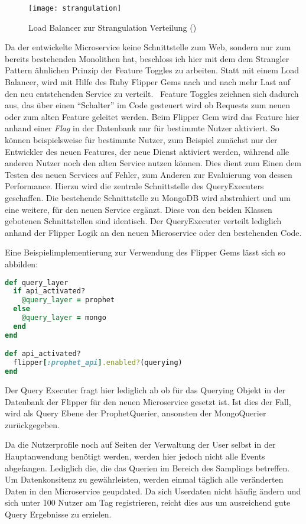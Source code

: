 \begin{figure}[h]
    \caption{Load Balancer zur Strangulation Verteilung (\cite{Hammant:Strangler})}
    \texttt{[image: strangulation]}
\end{figure}

Da der entwickelte Microservice keine Schnittstelle zum Web, sondern nur zum bereits bestehenden Monolithen hat, beschloss ich hier mit dem dem Strangler Pattern ähnlichen Prinzip der Feature Toggles\cite{fowler:featuretoggle} zu arbeiten. Statt mit einem Load Balancer, wird mit Hilfe des Ruby Flipper Gems\cite{flipper} nach und nach mehr Last auf den neu entstehenden Service zu verteilt.~\cite[vgl.][]{Hammant:Strangler}
Feature Toggles zeichnen sich dadurch aus, das über einen ``Schalter'' im Code gesteuert wird ob Requests zum neuen oder zum alten Feature geleitet werden. Beim Flipper Gem wird das Feature hier anhand einer \textit{Flag} in der Datenbank nur für bestimmte Nutzer aktiviert. So können beispielsweise für bestimmte Nutzer, zum Beispiel zunächst nur der Entwickler des neuen Features, der neue Dienst aktiviert werden, während alle anderen Nutzer noch den alten Service nutzen können. Dies dient zum Einen dem Testen des neuen Services auf Fehler, zum Anderen zur Evaluierung von dessen Performance.
Hierzu wird die zentrale Schnittstelle des QueryExecuters geschaffen. Die bestehende Schnittstelle zu MongoDB wird abstrahiert und um eine weitere, für den neuen Service ergänzt. Diese von den beiden Klassen gebotenen Schnittstellen sind identisch. Der QueryExecuter verteilt lediglich anhand der Flipper Logik an den neuen Microservice oder den bestehenden Code.

Eine Beispielimplementierung zur Verwendung des Flipper Gems lässt sich so abbilden:
\begin{lstlisting}[language=Ruby]
def query_layer
  if api_activated?
    @query_layer = prophet
  else
    @query_layer = mongo
  end
end

def api_activated?
  flipper[:prophet_api].enabled?(querying)
end
\end{lstlisting}
Der Query Executer fragt hier lediglich ab ob für das Querying Objekt in der Datenbank der Flipper für den neuen Microservice gesetzt ist. Ist dies der Fall, wird als Query Ebene der ProphetQuerier, ansonsten der MongoQuerier zurückgegeben.

Da die Nutzerprofile noch auf Seiten der Verwaltung der User selbst in der Hauptanwendung benötigt werden, werden hier jedoch nicht alle Events abgefangen. Lediglich die, die das Querien im Bereich des Samplings betreffen. Um Datenkonsitenz zu gewährleisten, werden einmal täglich alle veränderten Daten in den Microservice geupdated. Da sich Userdaten nicht häufig ändern und sich unter 100 Nutzer am Tag registrieren, reicht dies aus um ausreichend gute Query Ergebnisse zu erzielen.